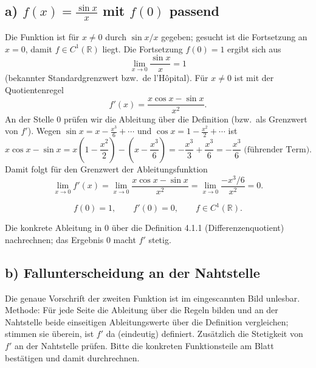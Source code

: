 
\subsection*{a) $f(x)=\frac{\sin x}{x}$ mit $f(0)$ passend}
Die Funktion ist für $x\neq0$ durch $\sin x/x$ gegeben; gesucht ist die
Fortsetzung an $x=0$, damit $f\in C^1(\mathbb R)$ liegt. Die Fortsetzung
$f(0)=1$ ergibt sich aus
\begin{equation}
  \lim_{x\to0}\frac{\sin x}{x}=1
\end{equation}
(bekannter Standardgrenzwert bzw.\ de l'Hôpital). Für $x\neq0$ ist mit der
Quotientenregel
\begin{equation}
  f'(x)=\frac{x\cos x-\sin x}{x^2}.
\end{equation}
An der Stelle $0$ prüfen wir die Ableitung über die Definition (bzw.\ als
Grenzwert von $f'$). Wegen $\sin x = x-\frac{x^3}{6}+\cdots$ und
$\cos x=1-\frac{x^2}{2}+\cdots$ ist
\begin{equation}
  x\cos x-\sin x
  = x\left(1-\frac{x^2}{2}\right)-\left(x-\frac{x^3}{6}\right)
  = -\frac{x^3}{3}+\frac{x^3}{6}
  = -\frac{x^3}{6}
  \;\text{(führender Term)}.
\end{equation}
Damit folgt für den Grenzwert der Ableitungsfunktion
\begin{equation}
  \lim_{x\to0} f'(x)
  =\lim_{x\to0}\frac{x\cos x-\sin x}{x^2}
  =\lim_{x\to0}\frac{-x^3/6}{x^2}
  =0.
\end{equation}
\begin{ergebnis}
\begin{equation*}
  f(0)=1,\qquad f'(0)=0,\qquad f\in C^1(\mathbb R).
\end{equation*}
\end{ergebnis}
Die konkrete Ableitung in $0$ über die Definition 4.1.1 (Differenzenquotient)
nachrechnen; das Ergebnis $0$ macht $f'$ stetig.

\subsection*{b) Fallunterscheidung an der Nahtstelle}
Die genaue Vorschrift der zweiten Funktion ist im eingescannten Bild unlesbar.
Methode: Für jede Seite die Ableitung über die Regeln bilden und an der
Nahtstelle beide einseitigen Ableitungswerte über die Definition vergleichen;
stimmen sie überein, ist $f'$ da (eindeutig) definiert. Zusätzlich die
Stetigkeit von $f'$ an der Nahtstelle prüfen. Bitte die konkreten Funktionsteile
am Blatt bestätigen und damit durchrechnen.

